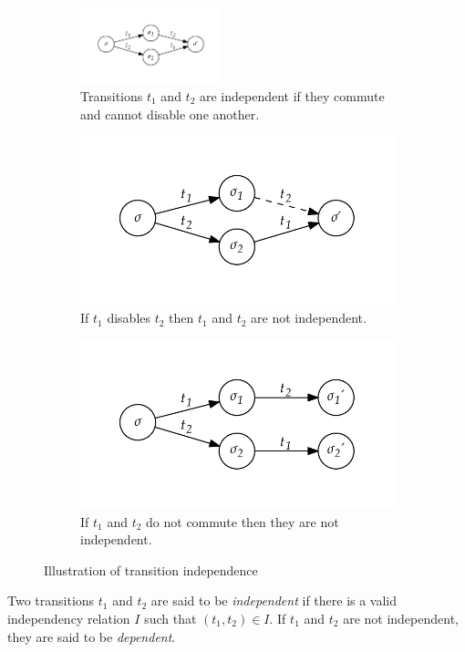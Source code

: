 \documentclass[12pt,a4paper,twoside,openright]{report}
\begin{document}
\begin{figure}[h]
	\centering
	\begin{subfigure}{\textwidth}
		\centering
		\includegraphics*[width=0.45\textwidth]{independence1}
		\caption{Transitions $t_1$ and $t_2$ are independent if
			they commute and cannot disable one another.}
	\end{subfigure}
	\begin{subfigure}{.45\textwidth}
		\centering
		\includegraphics*[width=\textwidth]{independence2}
		\caption{If $t_1$ disables $t_2$ then $t_1$ and $t_2$
			are not independent.}
	\end{subfigure}
	\quad
	\begin{subfigure}{.45\textwidth}
		\centering
		\includegraphics*[width=\textwidth]{independence3}
		\caption{If $t_1$ and $t_2$ do not commute then they
			are not independent.}
	\end{subfigure}
	\caption{Illustration of transition independence}
	\label{fig:independence}
\end{figure}
Two transitions $t_1$ and $t_2$ are said to be \emph{independent}
if there is a valid independency relation $I$ such that $(t_1, t_2) \in I$.
If $t_1$ and $t_2$ are not independent, they are said to be \emph{dependent}.
\end{document}
